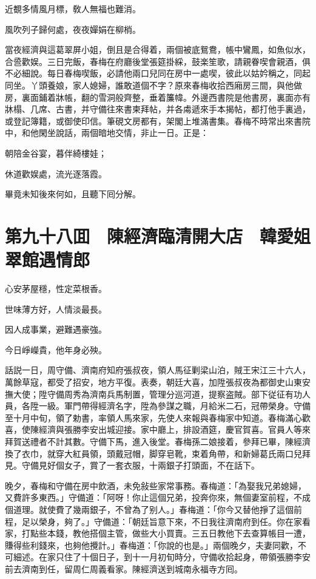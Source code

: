 近覩多情風月標，敎人無福也難消。

風吹列子歸何處，夜夜嬋娟在柳梢。

當夜經濟與這葛翠屏小姐，倒且是合得着，兩個被底鴛鴦，帳中鸞鳳，如魚似水，合巹歡娱。三日完飯，春梅在府廳後堂張筵掛綵，鼓楽笙歌，請親眷喫會親酒，俱不必細說。每日春梅喫飯，必請他兩口兒同在房中一處喫，彼此以姑妗稱之，同起同坐。丫頭養娘，家人媳婦，誰敢道個不字？原來春梅收拾西廂房三間，與他做房，裏面鋪着牀帳，翻的雪洞般齊整，垂着簾幃。外邊西書院是他書房，裏面亦有牀榻、几席、古書，并守備往來書柬拜帖，并各䖏遞來手本揭帖，都打他手裏過，或登記簿籍，或御使印信。筆硯文房都有，架閣上堆滿書集。春梅不時常出來書院中，和他閑坐說話，兩個暗地交情，非止一日。正是：

朝陪金谷宴，暮伴綺樓娃；

休道歡娱處，流光逐落霞。

畢竟未知後來何如，且聽下囘分解。

\chapter*{第九十八囬　陳經濟臨清開大店　韓愛姐翠館遇情郎}

心安茅屋穩，性定菜根香。

世味薄方好，人情淡最長。

因人成事業，避難遇豪強。

今日崢嶸貴，他年身必殃。

話説一日，周守備、濟南府知府張叔夜，領人馬征剿梁山泊，賊王宋江三十六人，萬餘草寇，都受了招安，地方平復。表奏，朝廷大喜，加陞張叔夜為都御史山東安撫大使；陞守備周秀為濟南兵馬制置，管理分巡河道，提察盗賊。部下従征有功人員，各陞一級。軍門帶得經濟名字，陞為參謀之職，月給米二石，冠帶榮身。守備至十月中旬，領了勅書，率領人馬來家，先使人來報與春梅家中知道。春梅滿心歡喜，使陳經濟與張勝李安出城迎接。家中廳上，排設酒筵，慶官賀喜。官員人等來拜賀送禮者不計其數。守備下馬，進入後堂。春梅孫二娘接着，參拜已畢，陳經濟換了衣巾，就穿大紅員領，頭戴冠帽，脚穿皂靴，束着角帶，和新婦葛氏兩口兒拜見。守備見好個女子，賞了一套衣服，十兩銀子打頭面，不在話下。

晚夕，春梅和守備在房中飲酒，未免敍些家常事務。春梅道：「為娶我兄弟媳婦，又費許多東西。」守備道：「阿呀！你止這個兄弟，投奔你來，無個妻室前程，不成個道理。就使費了幾兩銀子，不曾為了别人。」春梅道：「你今又替他掙了這個前程，足以榮身，夠了。」守備道：「朝廷旨意下來，不日我往濟南府到任。你在家看家，打點些本錢，教他搭個主管，做些大小買賣。三五日教他下去查算帳目一遭，賺得些利錢來，也夠他攪計。」春梅道：「你說的也是。」兩個晚夕，夫妻同歡，不可細述。在家只住了十個日子，到十一月初旬時分，守備收拾起身，帶領張勝李安前去濟南到任，留周仁周義看家。陳經濟送到城南永福寺方囘。

